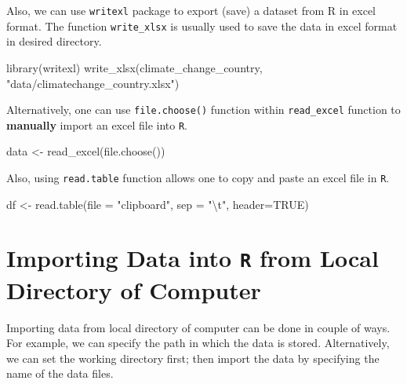 \documentclass[
]{book}
\newenvironment{Shaded}{\begin{snugshade}}{\end{snugshade}}
\newcommand{\AttributeTok}[1]{\textcolor[rgb]{0.77,0.63,0.00}{#1}}
\newcommand{\ConstantTok}[1]{\textcolor[rgb]{0.00,0.00,0.00}{#1}}
\newcommand{\FunctionTok}[1]{\textcolor[rgb]{0.00,0.00,0.00}{#1}}
\newcommand{\NormalTok}[1]{#1}
\newcommand{\OtherTok}[1]{\textcolor[rgb]{0.56,0.35,0.01}{#1}}
\newcommand{\SpecialCharTok}[1]{\textcolor[rgb]{0.00,0.00,0.00}{#1}}
\newcommand{\StringTok}[1]{\textcolor[rgb]{0.31,0.60,0.02}{#1}}
\begin{document}
Also, we can use \texttt{writexl} package to export (save) a dataset from R in excel format. The function \texttt{write\_xlsx} is usually used to save the data in excel format in desired directory.

\begin{Shaded}
\begin{Highlighting}[]
\FunctionTok{library}\NormalTok{(writexl)}
\FunctionTok{write\_xlsx}\NormalTok{(climate\_change\_country, }\StringTok{"data/climatechange\_country.xlsx"}\NormalTok{)}
\end{Highlighting}
\end{Shaded}

Alternatively, one can use \texttt{file.choose()} function within \texttt{read\_excel} function to \textbf{manually} import an excel file into \texttt{R}.

\begin{Shaded}
\begin{Highlighting}[]
\NormalTok{data }\OtherTok{\textless{}{-}} \FunctionTok{read\_excel}\NormalTok{(}\FunctionTok{file.choose}\NormalTok{())}
\end{Highlighting}
\end{Shaded}

Also, using \texttt{read.table} function allows one to copy and paste an excel file in \texttt{R}.

\begin{Shaded}
\begin{Highlighting}[]
\NormalTok{df }\OtherTok{\textless{}{-}} \FunctionTok{read.table}\NormalTok{(}\AttributeTok{file =} \StringTok{"clipboard"}\NormalTok{, }
                      \AttributeTok{sep =} \StringTok{"}\SpecialCharTok{\textbackslash{}t}\StringTok{"}\NormalTok{, }\AttributeTok{header=}\ConstantTok{TRUE}\NormalTok{)}
\end{Highlighting}
\end{Shaded}

\hypertarget{importing-data-into-r-from-local-directory-of-computer}{%
\section{\texorpdfstring{Importing Data into \texttt{R} from Local Directory of Computer}{Importing Data into R from Local Directory of Computer}}\label{importing-data-into-r-from-local-directory-of-computer}}

Importing data from local directory of computer can be done in couple of ways. For example, we can specify the path in which the data is stored. Alternatively, we can set the working directory first; then import the data by specifying the name of the data files.
\end{document}

